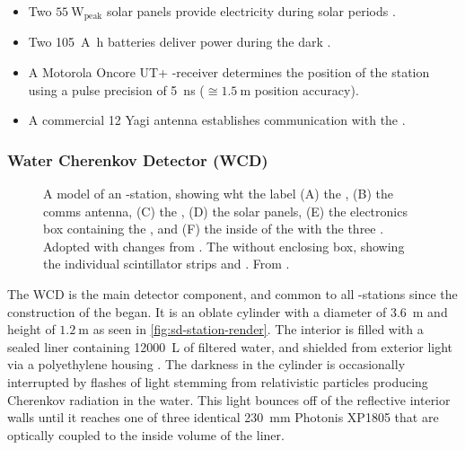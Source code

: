 \begin{itemize}
	\item Two $\SI{55}{\watt}_\mathrm{peak}$ solar panels provide 
	electricity during solar periods 
	\cite{collaborationPierreAugerObservatory2016}.
	\item Two \SI{105}{\ampere\hour} batteries deliver power during	the 
	dark \cite{collaborationPierreAugerObservatory2016}.
	\item A Motorola Oncore UT+ \GPS-receiver determines the position of the
	station using a pulse precision of \SI{5}{\nano\second} 
	\cite{networktimefoundationMotorolaOncoreGPS} ($\cong\SI{1.5}{\meter}$
	position accuracy).
	\item A commercial \SI{12}{\dBi} Yagi antenna \cite{rfwel12DBiYagi} 
	establishes communication with the \CDAS.
\end{itemize}

\subsubsection{Water Cherenkov Detector (WCD)}
\label{sssec:wcd}

\begin{figure}[t]
  \centering
  \hspace{0.2cm}
  \caption[]{ A model of an \SD-station, showing
  wht the label (A) the \RD, (B) the comms antenna, (C) the \SSD, (D) the solar
  panels, (E) the electronics box containing the \UUB, and (F) the inside of the
  \WCD with the three \LPMTs. Adopted with changes from 
  \cite{filipPotentialNeuralNetwork2023}.  The 
  \SSD without enclosing box, showing the individual scintillator strips and 
  \WLSs. From \cite{schmidtUHECR2024ProceedingEdits25}.}
  \label{fig:sd-station-components}
\end{figure}

The \acf{WCD} is the main detector component, and common to all \SD-stations 
since the construction of the \PAO began. It is an oblate cylinder with a 
diameter of \SI{3.6}{\meter} and height of $\SI{1.2}{\meter}$ as seen in 
\cref{fig:sd-station-render}. The interior is filled with a sealed liner 
containing \SI{12000}{\liter} of filtered water, and shielded from exterior 
light via a polyethylene housing \cite{allekotteSurfaceDetectorSystem2008}. The 
darkness in the cylinder is occasionally interrupted by flashes of light 
stemming from relativistic particles producing Cherenkov radiation in the water.
This light bounces off of the reflective interior walls until it reaches one of 
three identical \SI{230}{\milli\meter} Photonis XP1805 \LPMTs 
\cite{tripathiSystematicStudyLarge2003} that are optically coupled to the inside
volume of the liner.

